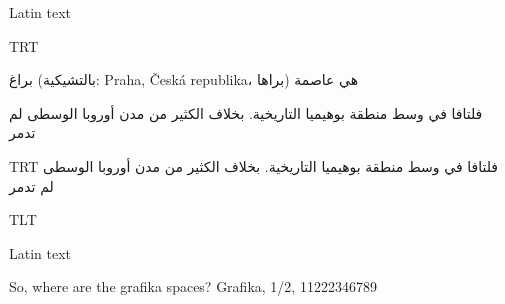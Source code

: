 \documentclass{article}
\begin{document}
\pokus

Latin text 

\pardir TRT

براغ (بالتشيكية: Praha, Česká republika، براها) هي عاصمة 


فلتافا في وسط منطقة بوهيميا التاريخية. بخلاف الكثير من مدن أوروبا الوسطى لم تدمر

{\textdir TRT
فلتافا في وسط منطقة بوهيميا التاريخية. بخلاف الكثير من مدن أوروبا الوسطى لم تدمر
}

\pardir TLT

\libertine
Latin text

So, where are the \bold grafika spaces\libertine? Grafika, 1/2, 11222346789
\end{document}
